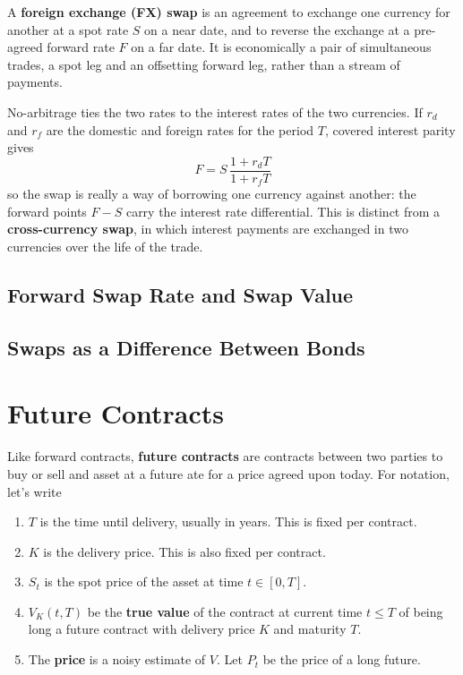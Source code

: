 \documentclass{article}
\begin{document}
    \begin{definition}
      \label{def:forex-swaps}
      A \textbf{foreign exchange (FX) swap} is an agreement to exchange one currency for another at a spot rate $S$ on a near date, and to reverse the exchange at a pre-agreed forward rate $F$ on a far date. It is economically a pair of simultaneous trades, a spot leg and an offsetting forward leg, rather than a stream of payments.

      No-arbitrage ties the two rates to the interest rates of the two currencies. If $r_d$ and $r_f$ are the domestic and foreign rates for the period $T$, covered interest parity gives
      \begin{equation}
        F = S \, \frac{1 + r_d T}{1 + r_f T}
      \end{equation}
      so the swap is really a way of borrowing one currency against another: the forward points $F - S$ carry the interest rate differential. This is distinct from a \textbf{cross-currency swap}, in which interest payments are exchanged in two currencies over the life of the trade. 
    \end{definition}

  \subsection{Forward Swap Rate and Swap Value}

  \subsection{Swaps as a Difference Between Bonds}

\section{Future Contracts}

  \begin{definition}[Futures]
    \label{def:futures}
    Like forward contracts, \textbf{future contracts} are contracts between two parties to buy or sell and asset at a future ate for a price agreed upon today. For notation, let's write 
    \begin{enumerate}
      \item $T$ is the time until delivery, usually in years. This is fixed per contract. 
      \item $K$ is the delivery price. This is also fixed per contract. 
      \item $S_t$ is the spot price of the asset at time $t \in [0, T]$. 
      \item $V_K (t, T)$ be the \textbf{true value} of the contract at current time $t \leq T$ of being long a future contract with delivery price $K$ and maturity $T$. 
      \item The \textbf{price} is a noisy estimate of $V$. Let $P_t$ be the price of a long future.
    \end{enumerate}
  \end{definition}
  
\end{document}
